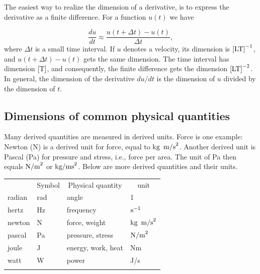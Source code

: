 \documentclass[graybox,envcountchap,sectrefs,final]{svmonodo}
\newenvironment{notice_mdfboxadmon}[1][]{
\begin{notice_mdfboxmdframed}[frametitle=#1]
}
{
\end{notice_mdfboxmdframed}
}
\begin{document}
\begin{notice_mdfboxadmon}
The easiest way to realize the dimension of a derivative, is to express
the derivative as a finite difference. For a function $u(t)$ we have

\[ \frac{du}{dt} \approx \frac{u(t+\Delta t)- u(t)}{\Delta t},\]
where $\Delta t$ is a small time interval.
If $u$ denotes a velocity, its dimension is $\hbox{[LT]}^{-1}$,
and $u(t+\Delta t) - u(t)$ gets the same dimension. The time
interval has dimension $\hbox{[T]}$, and consequently, the
finite difference gets the dimension $\hbox{[LT]}^{-2}$.
In general, the dimension of the derivative $du/dt$ is the dimension
of $u$ divided by the dimension of $t$.
\end{notice_mdfboxadmon}




\subsection{Dimensions of common physical quantities}
\label{scale:dimunit:tables}


Many derived quantities are measured in derived units. Force is one
example: Newton (N) is a derived unit for force, equal to $\hbox{kg\,
m/s}^2$. Another derived unit is Pascal (Pa) for pressure and stress,
i.e., force per area. The unit of Pa then equals $\hbox{N/m}^2$ or
$\hbox{kg/ms}^2$. Below are more derived quantities and their units.



{\small   %

\vspace{4mm}

\begin{tabular}{llll}
\hline\noalign{\smallskip}
\multicolumn{1}{c}{ Name } & \multicolumn{1}{c}{ Symbol } & \multicolumn{1}{c}{ Physical quantity } & \multicolumn{1}{c}{ unit } \\
\noalign{\smallskip}\svhline\noalign{\smallskip}
radian & rad    & angle              & 1                   \\
hertz  & Hz     & frequency          & $\hbox{s}^{-1}$     \\
newton & N      & force, weight      & $\hbox{kg\, m/s}^2$ \\
pascal & Pa     & pressure, stress   & $\hbox{N/m}^2$      \\
joule  & J      & energy, work, heat & Nm                  \\
watt   & W      & power              & J/s                 \\
\noalign{\smallskip}\hline\noalign{\smallskip}
\end{tabular}

\vspace{4mm}

}
\end{document}
